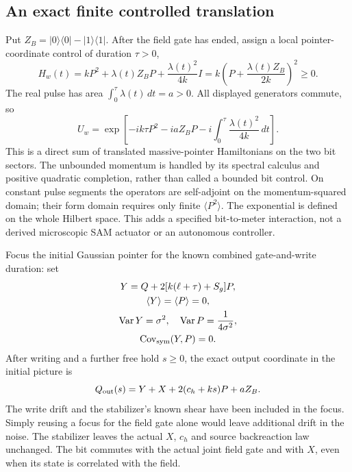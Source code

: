 \subsection{An exact finite controlled translation}
\label{sec:chvidr-controlled-translation}

Put $Z_B=|0\rangle\langle0|-|1\rangle\langle1|$. After the field gate
has ended, assign a local pointer-coordinate control of duration $\tau>0$,
\begin{equation}
 H_w(t)=kP^2+\lambda(t)Z_BP+\frac{\lambda(t)^2}{4k}I
       =k\left(P+\frac{\lambda(t)Z_B}{2k}\right)^2\geq0.
 \label{eq:chvidr-positive-bit-translation}
\end{equation}
The real pulse has area $\int_0^\tau\lambda(t)\,dt=a>0$.
All displayed generators commute, so
\begin{equation}
 U_w=\exp\!\left[-ik\tau P^2-iaZ_BP
                   -i\int_0^\tau\frac{\lambda(t)^2}{4k}\,dt\right].
 \label{eq:chvidr-exact-write-unitary}
\end{equation}
This is a direct sum of translated massive-pointer Hamiltonians on the
two bit sectors. The unbounded momentum is handled by its spectral
calculus and positive quadratic completion, rather than called a bounded
bit control. On constant pulse segments the operators are self-adjoint
on the momentum-squared domain; their form domain requires only finite
$\langle P^2\rangle$. The exponential is defined on the whole Hilbert
space. This adds a specified bit-to-meter interaction, not a derived
microscopic SAM actuator or an autonomous controller.

Focus the initial Gaussian pointer for the known combined gate-and-write
duration: set
\begin{equation}
\begin{gathered}
Y=Q+2[k(\ell+\tau)+S_g]P,\\
 \langle Y\rangle=\langle P\rangle=0,
 \\ \operatorname{Var}Y=\sigma^2,\quad
 \operatorname{Var}P=\frac1{4\sigma^2},\\
 \operatorname{Cov}_{\rm sym}(Y,P)=0.
\end{gathered}
\label{eq:chvidr-full-duration-focus}
\end{equation}
After writing and a further free hold $s\geq0$, the exact output coordinate
in the initial picture is
\begin{equation}
 Q_{\rm out}(s)=Y+X+2(c_h+ks)P+aZ_B.
 \label{eq:chvidr-written-pointer-output}
\end{equation}
The write drift and the stabilizer's known shear have been included in
the focus. Simply reusing a focus for the field gate alone would leave
additional drift in the noise. The stabilizer leaves the actual $X$,
$c_h$ and source backreaction law unchanged. The bit commutes with the actual joint field gate and with $X$,
even when its state is correlated with the field.

